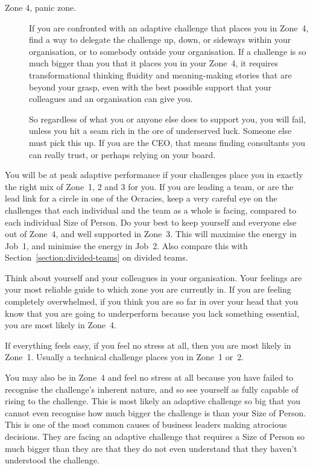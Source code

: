 \begin{description}
\item[Zone 4, panic zone.] If you are confronted with an adaptive challenge that places you in Zone~4, find a way to delegate the challenge up, down, or sideways within your organisation, or to somebody outside your organisation. If a challenge is so much bigger than you that it places you in your Zone~4, it requires transformational thinking fluidity and meaning\hyp{}making stories that are beyond your grasp, even with the best possible support that your colleagues and an organisation can give you.


So regardless of what you or anyone else does to support you, you will fail, unless you hit a seam rich in the ore of underserved luck. Someone else must pick this up. If you are the CEO, that means finding consultants you can really trust, or perhaps relying on your board.
\end{description}


You will be at peak adaptive performance if your challenges place you in exactly the right mix of Zone~1, 2 and 3 for you. If you are leading a team, or are the lead link for a circle in one of the Ocracies, keep a very careful eye on the challenges that each individual and the team as a whole is facing, compared to each individual Size of Person. Do your best to keep yourself and everyone else out of Zone~4, and well supported in Zone~3. This will maximise the energy in Job~1, and minimise the energy in Job~2. Also compare this with Section~\ref{section:divided-teams} on divided teams.


Think about yourself and your colleagues in your organisation. Your feelings  are your most reliable guide to which zone you are currently in. If you are feeling completely overwhelmed, if you think you are so far in over your head\cite{kegan-in-over} that you know that you are going to underperform because you lack something essential, you are most likely in Zone~4.


If everything feels easy, if you feel no stress at all, then you are most likely in Zone~1. Usually a technical challenge places you in Zone~1 or~2.


You may also be in Zone~4 and feel no stress at all because you have failed to recognise the challenge’s inherent nature, and so see yourself as fully capable of rising to the challenge. This is most likely an adaptive challenge so big that you cannot even recognise how much bigger the challenge is than your Size of Person.  This is one of the most common causes of business leaders making atrocious decisions. They are facing an adaptive challenge that requires a Size of Person so much bigger than they are that they do not even understand that they haven't understood the challenge. 


